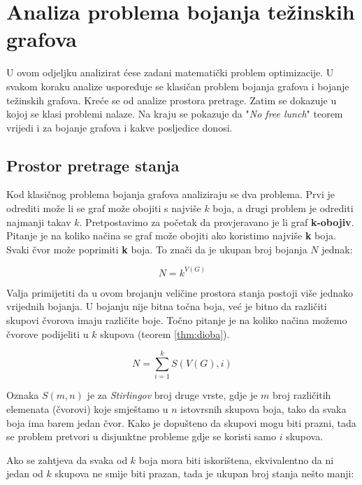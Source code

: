 \documentclass[times, utf8, diplomski, numeric]{fer}
\begin{document}
\section{Analiza problema bojanja težinskih grafova}

U ovom odjeljku analizirat ćese zadani matematički problem optimizacije. U svakom koraku analize uspoređuje se klasičan problem bojanja grafova i bojanje težinskih grafova. Kreće se od analize prostora pretrage. Zatim se dokazuje u kojoj se klasi problemi nalaze. Na kraju se pokazuje da "\emph{No free lunch}" teorem vrijedi i za bojanje grafova i kakve posljedice donosi.

\subsection{Prostor pretrage stanja}

Kod klasičnog problema bojanja grafova analiziraju se dva problema. Prvi je odrediti može li se graf može obojiti s najviše $k$ boja, a drugi problem je odrediti najmanji takav $k$. Pretpostavimo za početak da provjeravano je li graf \textbf{k-obojiv}. Pitanje je na koliko načina se graf može obojiti ako koristimo najviše \textbf{k} boja. Svaki čvor može poprimiti \textbf{k} boja. To znači da je ukupan broj bojanja $N$ jednak: 

\begin{equation}
N = k^{V(G)} 
\end{equation}

Valja primijetiti da u ovom brojanju veličine prostora stanja postoji više jednako vrijednih bojanja. U bojanju nije bitna točna boja, već je bitno da različiti skupovi čvorova imaju različite boje. Točno pitanje je na koliko načina možemo čvorove podijeliti u $k$ skupova (teorem \ref{thm:dioba}).  

\begin{equation}
N = \sum_{i=1}^{k} S(V(G), i)
\end{equation}

Oznaka $S(m,n)$ je za \emph{Stirlingov} broj druge vrste, gdje je $m$ broj različitih elemenata (čvorovi) koje smještamo u $n$ istovrsnih skupova boja, tako da svaka boja ima barem jedan čvor. Kako je dopušteno da skupovi mogu biti prazni, tada se problem pretvori u disjunktne probleme gdje se koristi samo $i$ skupova. 

Ako se zahtjeva da svaka od $k$ boja mora biti iskorištena, ekvivalentno da ni jedan od $k$ skupova ne smije biti prazan, tada je ukupan broj stanja nešto manji:
\end{document}
